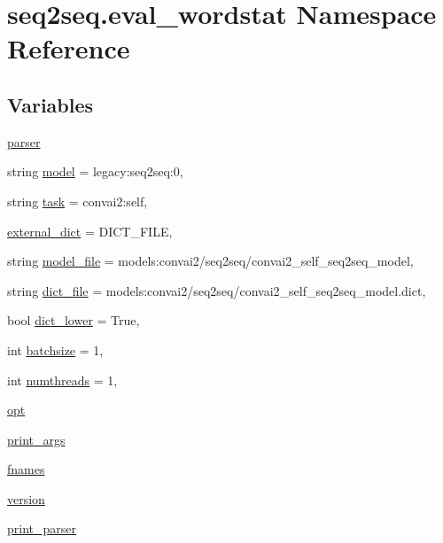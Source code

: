 \hypertarget{namespaceseq2seq_1_1eval__wordstat}{}\section{seq2seq.\+eval\+\_\+wordstat Namespace Reference}
\label{namespaceseq2seq_1_1eval__wordstat}
\subsection*{Variables}
\begin{DoxyCompactItemize}
\item 
\hyperlink{namespaceseq2seq_1_1eval__wordstat_a08ac33c3b3c9bae6a47eea63ae40ae01}{parser}
\item 
string \hyperlink{namespaceseq2seq_1_1eval__wordstat_a6fccc50c1e7ecda2979bdc91b61a946a}{model} = \textquotesingle{}legacy\+:seq2seq\+:0\textquotesingle{},
\item 
string \hyperlink{namespaceseq2seq_1_1eval__wordstat_a4a826c6e249e377fa071bbc27aed278b}{task} = \textquotesingle{}convai2\+:self\textquotesingle{},
\item 
\hyperlink{namespaceseq2seq_1_1eval__wordstat_a20f55c53fd6e2f7195256c802d912dae}{external\+\_\+dict} = D\+I\+C\+T\+\_\+\+F\+I\+LE,
\item 
string \hyperlink{namespaceseq2seq_1_1eval__wordstat_ae3eab5fd2b1728e668af85857f931f22}{model\+\_\+file} = \textquotesingle{}models\+:convai2/seq2seq/convai2\+\_\+self\+\_\+seq2seq\+\_\+model\textquotesingle{},
\item 
string \hyperlink{namespaceseq2seq_1_1eval__wordstat_a472125949b83708d9d07fbaf8d87b42c}{dict\+\_\+file} = \textquotesingle{}models\+:convai2/seq2seq/convai2\+\_\+self\+\_\+seq2seq\+\_\+model.\+dict\textquotesingle{},
\item 
bool \hyperlink{namespaceseq2seq_1_1eval__wordstat_a634213542a6f717d70e85c9f4f446791}{dict\+\_\+lower} = True,
\item 
int \hyperlink{namespaceseq2seq_1_1eval__wordstat_ad9c970cb4f3bc492f1c75aca130dccaa}{batchsize} = 1,
\item 
int \hyperlink{namespaceseq2seq_1_1eval__wordstat_aab69b7dcc4a5d2df292aa098a81ff1e7}{numthreads} = 1,
\item 
\hyperlink{namespaceseq2seq_1_1eval__wordstat_a38b14cace5d789154434b807b9e217d2}{opt}
\item 
\hyperlink{namespaceseq2seq_1_1eval__wordstat_a51db2b94a0983ad32449f5e3159e7063}{print\+\_\+args}
\item 
\hyperlink{namespaceseq2seq_1_1eval__wordstat_a98b3dd6b5bf78cf8d6b1c15a9d243e8a}{fnames}
\item 
\hyperlink{namespaceseq2seq_1_1eval__wordstat_ac0b00d1f99bfdadc0535936a7b9042eb}{version}
\item 
\hyperlink{namespaceseq2seq_1_1eval__wordstat_aed68902b90c301195f0157209afbaf0a}{print\+\_\+parser}
\end{DoxyCompactItemize}


